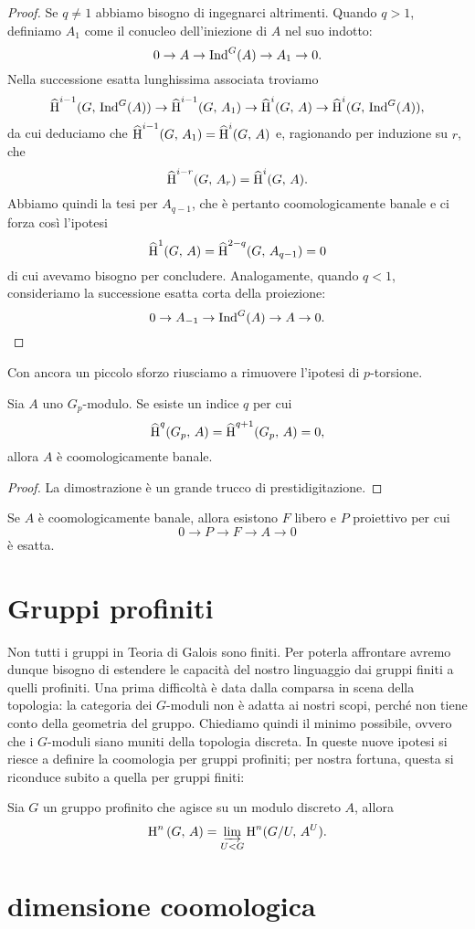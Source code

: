 \begin{proof}
	Se $ q \neq 1 $ abbiamo bisogno di ingegnarci altrimenti. Quando $ q > 1 $, definiamo $ A_1 $ come il conucleo dell'iniezione di $ A $ nel suo indotto:
	\[ 0 \to A \to \operatorname{Ind}^G(A) \to A_1 \to 0. \]
	Nella successione esatta lunghissima associata troviamo
	\[ \operatorname{\widehat{H}}^{i-1}(G, \, \operatorname{Ind}^G(A)) \to \operatorname{\widehat{H}}^{i-1}(G, \, A_1) \to \operatorname{\widehat{H}}^{i}(G, \, A) \to \operatorname{\widehat{H}}^{i}(G, \, \operatorname{Ind}^G(A)),  \]
	da cui deduciamo che $ \operatorname{\widehat{H}}^{i-1}(G, \, A_1) = \operatorname{\widehat{H}}^{i}(G, \, A) $ e, ragionando per induzione su $ r $, che
	\[ \operatorname{\widehat{H}}^{i-r}(G, \, A_r) = \operatorname{\widehat{H}}^{i}(G, \, A). \] 
	Abbiamo quindi la tesi per $ A_{q-1} $, che è pertanto coomologicamente banale e ci forza così l'ipotesi 
	\[ \operatorname{\widehat{H}}^1(G, \, A) = \operatorname{\widehat{H}}^{2-q}(G, \, A_{q-1}) = 0 \]
	di cui avevamo bisogno per concludere.
	Analogamente, quando $ q < 1 $, consideriamo la successione esatta corta della proiezione:
	\[ 0 \to A_{-1} \to \operatorname{Ind}^G(A) \to A \to 0. \]
\end{proof}

Con ancora un piccolo sforzo riusciamo a rimuovere l'ipotesi di $ p $-torsione.

\begin{theorem}
	Sia $ A $ uno $ G_p $-modulo. Se esiste un indice $ q $ per cui
	\[ \operatorname{\widehat{H}}^q(G_p, \, A) = \operatorname{\widehat{H}}^{q+1}(G_p, \, A) = 0, \]
	allora $ A $ è coomologicamente banale.
\end{theorem}

\begin{proof}
	La dimostrazione è un grande trucco di prestidigitazione.
\end{proof}

\begin{corollary}
	Se $ A $ è coomologicamente banale, allora esistono $ F $ libero e $ P $ proiettivo per cui
	\[ 0 \to P \to F \to A \to 0 \]
	è esatta.
\end{corollary}

\section{Gruppi profiniti}
Non tutti i gruppi in Teoria di Galois sono finiti. Per poterla affrontare avremo dunque bisogno di estendere le capacità del nostro linguaggio dai gruppi finiti a quelli profiniti. Una prima difficoltà è data dalla comparsa in scena della topologia: la categoria dei $ G $-moduli non è adatta ai nostri scopi, perché non tiene conto della geometria del gruppo. Chiediamo quindi il minimo possibile, ovvero che i $ G $-moduli siano muniti della topologia discreta. In queste nuove ipotesi si riesce a definire la coomologia per gruppi profiniti; per nostra fortuna, questa si riconduce subito a quella per gruppi finiti:

\begin{proposition}
	Sia $ G $ un gruppo profinito che agisce su un modulo discreto $ A $, allora
	\[ \operatorname{H}^n \left(G, \, A \right)  = \varinjlim_{U < G} \operatorname{H}^n(G/U, \, A^U). \]
\end{proposition}

\section{dimensione coomologica}